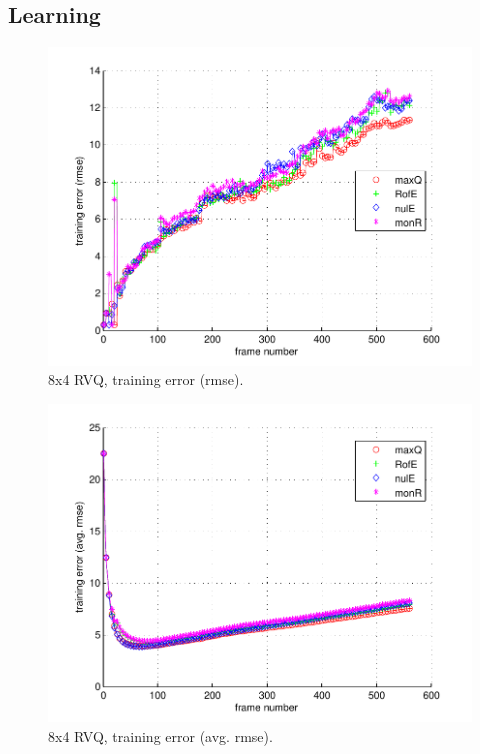 \subsection{Learning}
								\begin{figure}[h!]
								\centering
								\includegraphics[height=0.4\textheight]{thesis/1_Dudek_8_4_1000_trg_rmse.pdf}
								\caption{8x4 RVQ, training error (rmse).}
								\label{fig:1_Dudek_8_4_1000_trg_rmse}
								\end{figure}


								\begin{figure}[h!]
								\centering
								\includegraphics[height=0.4\textheight]{thesis/1_Dudek_8_4_1000_trg_armse.pdf}
								\caption{8x4 RVQ, training error (avg. rmse).}
								\label{fig:1_Dudek_8_4_1000_trg_armse}
								\end{figure}

